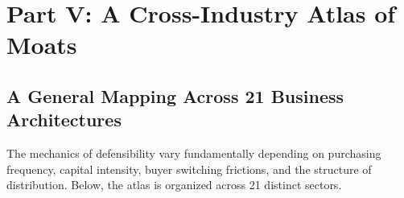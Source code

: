 \section*{Part V: A Cross-Industry Atlas of Moats}
\label{sec:part5_cross_industry_atlas_of_moats}

\subsection{A General Mapping Across 21 Business Architectures}
\label{sec:general_mapping_table}

The mechanics of defensibility vary fundamentally depending on purchasing frequency, capital intensity, buyer switching frictions, and the structure of distribution. Below, the atlas is organized across 21 distinct sectors.

